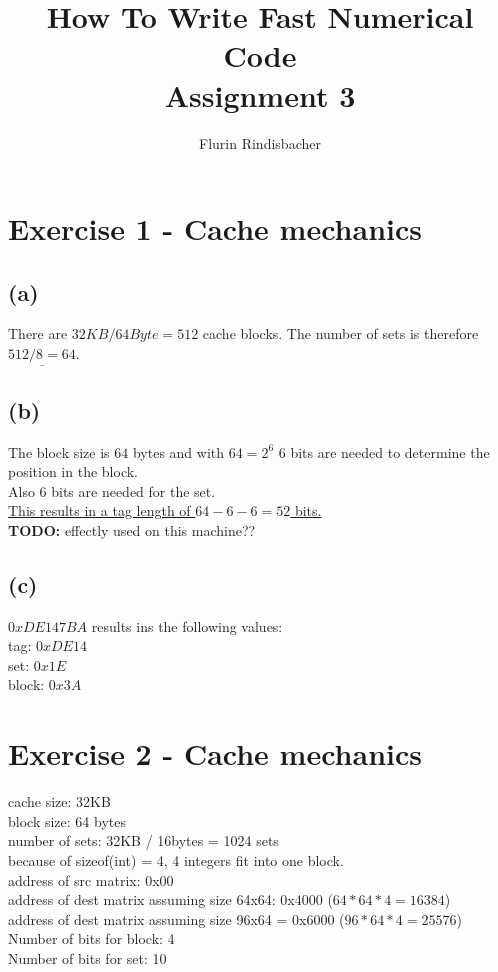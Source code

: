 \documentclass[10pt,a4paper,oneside,notitlepage]{report}
\author{Flurin Rindisbacher}
\title{How To Write Fast Numerical Code \\ \vspace{6 mm} \textbf{Assignment 3}}
\begin{document}
\maketitle

\section*{Exercise 1 - Cache mechanics}
\subsection*{(a)}
There are $32KB / 64 Byte = 512$ cache blocks. The number of sets is therefore $\underline{512 / 8=64}$.

\subsection*{(b)}
The block size is $64$ bytes and with $64=2^6$ 6 bits are needed to determine the position in the block. \\
Also 6 bits are needed for the set. \\
\underline{This results in a tag length of $64 - 6 - 6=52$ bits.}
\\
\textbf{TODO:} effectly used on this machine??

\subsection*{(c)}
$0xDE147BA$ results ins the following values: \\
tag: $0xDE14$ \\
set: $0x1E$ \\
block: $0x3A$

\section*{Exercise 2 - Cache mechanics}
cache size: 32KB \\
block size: 64 bytes \\
number of sets: 32KB / 16bytes = 1024 sets \\
because of sizeof(int) = 4, 4 integers fit into one block. \\
address of src matrix: 0x00 \\
address of dest matrix assuming size 64x64: 0x4000 ($64*64*4=16384$) \\
address of dest matrix assuming size 96x64 = 0x6000 ($96*64*4=25576$) \\
Number of bits for block: 4 \\
Number of bits for set: 10\\
\end{document}
